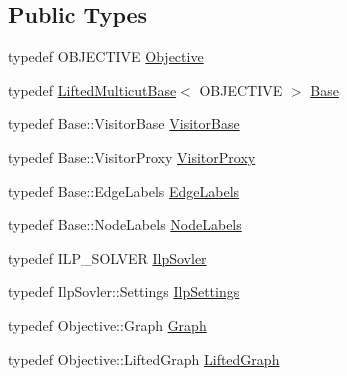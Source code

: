 \subsection*{Public Types}
\begin{DoxyCompactItemize}
\item 
typedef O\+B\+J\+E\+C\+T\+I\+V\+E \hyperlink{classnifty_1_1graph_1_1lifted__multicut_1_1LiftedMulticutIlp_a9e7a118481038bcb5b4f1a41edd05b39}{Objective}
\item 
typedef \hyperlink{classnifty_1_1graph_1_1lifted__multicut_1_1LiftedMulticutBase}{Lifted\+Multicut\+Base}$<$ O\+B\+J\+E\+C\+T\+I\+V\+E $>$ \hyperlink{classnifty_1_1graph_1_1lifted__multicut_1_1LiftedMulticutIlp_a81b3d26f103b08b880d009dde5e6fc64}{Base}
\item 
typedef Base\+::\+Visitor\+Base \hyperlink{classnifty_1_1graph_1_1lifted__multicut_1_1LiftedMulticutIlp_a1bc9b2e1c6bd45ec6d201a8150935edc}{Visitor\+Base}
\item 
typedef Base\+::\+Visitor\+Proxy \hyperlink{classnifty_1_1graph_1_1lifted__multicut_1_1LiftedMulticutIlp_ab1f196786ef302060d3dacba919dd60b}{Visitor\+Proxy}
\item 
typedef Base\+::\+Edge\+Labels \hyperlink{classnifty_1_1graph_1_1lifted__multicut_1_1LiftedMulticutIlp_a95069f2159b762644c2b918ce978fdfa}{Edge\+Labels}
\item 
typedef Base\+::\+Node\+Labels \hyperlink{classnifty_1_1graph_1_1lifted__multicut_1_1LiftedMulticutIlp_ab9a112af2057c917ee8f86723df0fe19}{Node\+Labels}
\item 
typedef I\+L\+P\+\_\+\+S\+O\+L\+V\+E\+R \hyperlink{classnifty_1_1graph_1_1lifted__multicut_1_1LiftedMulticutIlp_abb75426c93adf0ef05ce4a38004dbaef}{Ilp\+Sovler}
\item 
typedef Ilp\+Sovler\+::\+Settings \hyperlink{classnifty_1_1graph_1_1lifted__multicut_1_1LiftedMulticutIlp_a1660192dd643891762ce8f0e576a7053}{Ilp\+Settings}
\item 
typedef Objective\+::\+Graph \hyperlink{classnifty_1_1graph_1_1lifted__multicut_1_1LiftedMulticutIlp_a9bb8c61f3507a562468d329a243d0603}{Graph}
\item 
typedef Objective\+::\+Lifted\+Graph \hyperlink{classnifty_1_1graph_1_1lifted__multicut_1_1LiftedMulticutIlp_a754b340c90447fa603a1d05c0ce0aa72}{Lifted\+Graph}
\end{DoxyCompactItemize}
